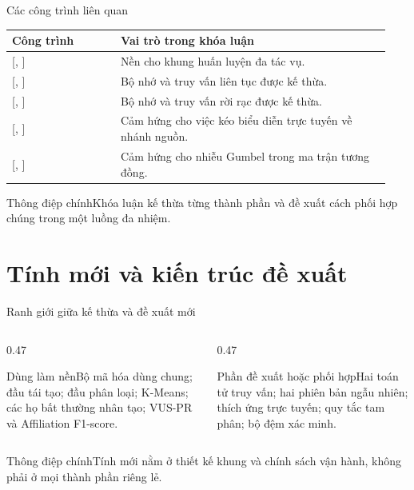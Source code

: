 \documentclass[aspectratio=169]{beamer}
\newcommand{\takeaway}[1]{\begin{alertblock}{Thông điệp chính}#1\end{alertblock}}
\newcommand{\paperref}[1]{\textcolor{mydarkred}{[\citeauthor{#1}, \citeyear{#1}]}}
\begin{document}
\begin{frame}{Các công trình liên quan}
  \scriptsize
  \begin{tabular}{>{\raggedright\arraybackslash}p{0.27\linewidth} >{\raggedright\arraybackslash}p{0.67\linewidth}}
    \toprule
    Công trình & Vai trò trong khóa luận \\
    \midrule
    \paperref{redlamp2025} & Nền cho khung huấn luyện đa tác vụ. \\
    \paperref{shen2025learn} & Bộ nhớ và truy vấn liên tục được kế thừa. \\
    \paperref{oord2017neural} & Bộ nhớ và truy vấn rời rạc được kế thừa. \\
    \paperref{zhang2024adarealign} & Cảm hứng cho việc kéo biểu diễn trực tuyến về nhánh nguồn. \\
    \paperref{pei2022transformer} & Cảm hứng cho nhiễu Gumbel trong ma trận tương đồng. \\
    \bottomrule
  \end{tabular}
  \takeaway{Khóa luận kế thừa từng thành phần và đề xuất cách phối hợp chúng trong một luồng đa nhiệm.}
\end{frame}

\section{Tính mới và kiến trúc đề xuất}

\begin{frame}{Ranh giới giữa kế thừa và đề xuất mới}
  \begin{columns}[T,onlytextwidth]
    \begin{column}{0.47\textwidth}\begin{block}{Dùng làm nền}Bộ mã hóa dùng chung; đầu tái tạo; đầu phân loại; K-Means; các họ bất thường nhân tạo; VUS-PR và Affiliation F1-score.\end{block}\end{column}
    \begin{column}{0.47\textwidth}\begin{exampleblock}{Phần đề xuất hoặc phối hợp}Hai toán tử truy vấn; hai phiên bản ngẫu nhiên; thích ứng trực tuyến; quy tắc tam phân; bộ đệm xác minh.\end{exampleblock}\end{column}
  \end{columns}
  \takeaway{Tính mới nằm ở thiết kế khung và chính sách vận hành, không phải ở mọi thành phần riêng lẻ.}
\end{frame}
\end{document}
